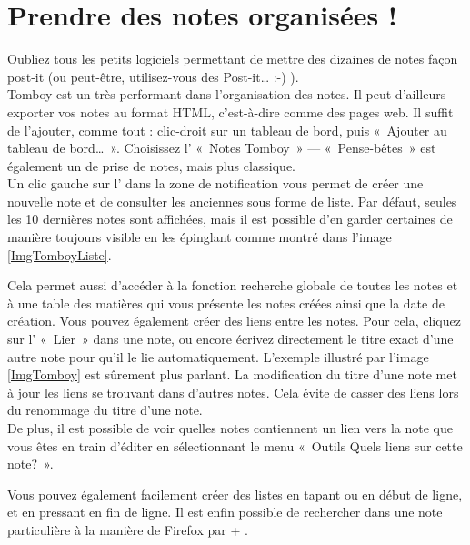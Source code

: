 \section{Prendre des notes organisées !}
\label{RefTomboy}
Oubliez tous les petits logiciels permettant de mettre des dizaines de notes façon post-it (ou peut-être, utilisez-vous des Post-it\ldots{} :-) ).\\
Tomboy est un  très performant dans l'organisation des notes. Il peut d'ailleurs exporter vos notes au format HTML, c'est-à-dire comme des pages web. Il suffit de l'ajouter, comme tout  : clic-droit sur un tableau de bord, puis «~Ajouter au tableau de bord\ldots{}~». Choisissez l' «~Notes Tomboy~» --- «~Pense-bêtes~» est également un  de prise de notes, mais plus classique.\\
Un clic gauche sur l' dans la zone de notification vous permet de créer une nouvelle note et de consulter les anciennes sous forme de liste. Par défaut, seules les 10 dernières notes sont affichées, mais il est possible d'en garder certaines de manière toujours visible en les épinglant comme montré dans l'image \ref{ImgTomboyListe}.\par
{}
Cela permet aussi d'accéder à la fonction recherche globale de toutes les notes et à une table des matières qui vous présente les notes créées ainsi que la date de création. Vous pouvez également créer des liens entre les notes. Pour cela, cliquez sur l' «~Lier~» dans une note, ou encore écrivez directement le titre exact d'une autre note pour qu'il le lie automatiquement. L'exemple illustré par l'image \ref{ImgTomboy} est sûrement plus parlant. La modification du titre d'une note met à jour les liens se trouvant dans d'autres notes. Cela évite de casser des liens lors du renommage du titre d'une note.\\
De plus, il est possible de voir quelles notes contiennent un lien vers la note que vous êtes en train d'éditer en sélectionnant le menu «~Outils \FlecheDroite Quels liens sur cette note?~».\par
Vous pouvez également facilement créer des listes en tapant \Touche{*} ou \Touche{-} en début de ligne, et en pressant  en fin de ligne. Il est enfin possible de rechercher dans une note particulière à la manière de Firefox par  + .\par
